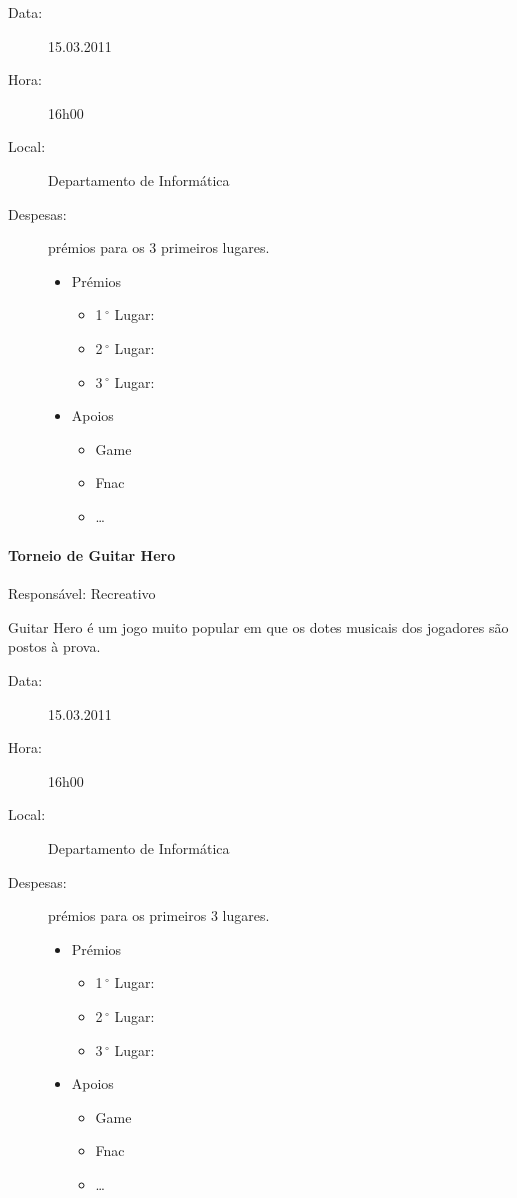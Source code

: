 \begin{description}
	\item[Data:] 15.03.2011
	\item[Hora:] 16h00
	\item[Local:] Departamento de Informática
	\item[Despesas:] prémios para os 3 primeiros lugares.
	\begin{itemize}
		\item Prémios
		\begin{itemize}
			\item 1$\,^{\circ}$ Lugar:
			\item 2$\,^{\circ}$ Lugar:
			\item 3$\,^{\circ}$ Lugar:
		\end{itemize}
		\item Apoios
		\begin{itemize}
			\item Game
			\item Fnac
			\item \dots  
		\end{itemize}
	\end{itemize}
\end{description}


\paragraph{Torneio de Guitar Hero}
Responsável: Recreativo

Guitar Hero é um jogo muito popular em que os dotes musicais dos jogadores são postos à prova.

\begin{description}
	\item[Data:] 15.03.2011
	\item[Hora:] 16h00
	\item[Local:] Departamento de Informática
	\item[Despesas:] prémios para os primeiros 3 lugares.
	\begin{itemize}
		\item Prémios
		\begin{itemize}
			\item 1$\,^{\circ}$ Lugar:
			\item 2$\,^{\circ}$ Lugar:
			\item 3$\,^{\circ}$ Lugar:
		\end{itemize}
		\item Apoios
		\begin{itemize}
			\item Game
			\item Fnac
			\item \dots  
		\end{itemize}
	\end{itemize}
\end{description}


